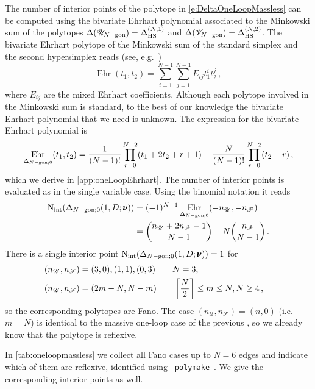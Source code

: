 \documentclass[12pt,a4paper]{article}
\theoremstyle{plain}
\theoremstyle{remark}
\newcommand{\nprops}{N}
\DeclareMathOperator{\nint}{N_{\mathrm{int}}}
\newcommand{\cU}{\mathscr {U}}
\newcommand{\cF}{\mathscr {F}}
\newcommand{\cV}{\mathscr {V}}
\newcommand{\undernotation}[1]{\pmb{#1}}
\newcommand{\Newton}{\Delta}
\DeclareMathOperator{\ehr}{Ehr}
\newcommand{\simplexwithpars}[1]{\Newton_{\text{HS}}^{(#1)}}
\begin{document}
The number of interior points of the polytope in
\cref{e:DeltaOneLoopMassless} can be computed using the bivariate
Ehrhart polynomial associated to the Minkowski sum of the polytopes
$\Newton(\cU_{\nprops-\rm gon})=\simplexwithpars{\nprops,1}$ and $\Newton(\cV_{\nprops-\rm
  gon})=\simplexwithpars{\nprops,2}$. The bivariate Ehrhart polytope of the Minkowski sum of the standard simplex
and the second hypersimplex reads (see, e.g.~\cite[Chapter~9]{Beck:2015})
\begin{equation}\label{e:EhPolOneLoopMassless}
  \ehr(t_1,t_2)=
  \sum_{i=1}^{\nprops-1}\sum_{j=1}^{\nprops-1} E_{ij} t_1^i t_2^j \,,
\end{equation}
where $E_{ij}$ are the mixed Ehrhart coefficients. Although each polytope involved in the Minkowski sum is standard,  to the best of our knowledge the bivariate Ehrhart polynomial that we need is unknown.
The expression for the bivariate Ehrhart polynomial is
\begin{equation}\label{e:EhNgonConj}
\ehr_{\Delta_{\nprops-\rm gon;0}}(t_1,t_2)={1\over
       (\nprops-1)!} \prod_{r=0}^{\nprops-2} (t_1+2t_2+r+1)
     -{\nprops\over (\nprops-1)!} \prod_{r=0}^{\nprops-2} (t_2+r)\,,
\end{equation}
which we derive in \cref{app:oneLoopEhrhart}. The number of interior points is evaluated as in the single variable
case.  Using the binomial notation it reads
\begin{equation}
	\begin{aligned}
		\nint(\Delta_{\nprops-\rm gon;0}(1,D;\undernotation{\nu})) &=
		(-1)^{\nprops-1}  \ehr_{\Delta_{\nprops-\rm gon;0}}(-n_{\cU}, -n_{\cF}) \\
		&= \binom{n_\cU + 2n_\cF - 1}{N-1} - N \binom{n_\cF}{N-1}\,.
	\end{aligned}
\end{equation}
%
There is a single interior point $
\nint(\Delta_{\nprops-\rm gon;0}(1,D;\undernotation{\nu}))=1$
for
\begin{align}
  (n_\cU,n_\cF)&=(3,0), (1,1), (0,3)\qquad \nprops=3,\cr
  (n_\cU,n_\cF)&=(2m-\nprops,\nprops-m)\qquad
                 \left\lceil\nprops\over2\right\rceil\leq m\leq
                 \nprops, \nprops\geq4\,,
\end{align}
so the corresponding polytopes are Fano.
%
The case $ (n_\cU,n_\cF)=(n,0)$ (i.e.\ $m=\nprops$) is identical to the massive one-loop
case of the previous , so we already know that the polytope is reflexive.

In \cref{tab:oneloopmassless} we collect all Fano cases up to $\nprops=6$ edges and indicate which of them are reflexive, identified using {\tt
  polymake}~\cite{polymake:FPSAC_2009}. We give the corresponding interior points as well. 
\end{document}
